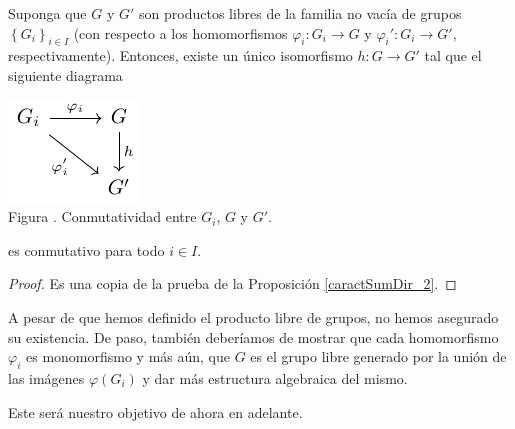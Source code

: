 \documentclass[12pt]{report}
\theoremstyle{largebreak}
\newcommand\cf[3]{\ensuremath{#1:#2\rightarrow#3}}
\newcounter{figcount}
\begin{document}
    \begin{propo}
        Suponga que $G$ y $G'$ son productos libres de la familia no vacía de grupos $\left\{G_i \right\}_{ i\in I}$ (con respecto a los homomorfismos $\cf{\varphi_i}{G_i}{G}$ y $\cf{\varphi_i'}{G_i}{G'}$, respectivamente). Entonces, existe un único isomorfismo $\cf{h}{G}{G'}$ tal que el siguiente diagrama

        \begin{minipage}{\textwidth}
            \begin{center}
                \includegraphics[scale=1.5]{images/fig_11.pdf}\\
                Figura \thefigcount. Conmutatividad entre $G_i$, $G$ y $G'$.
            \end{center}
        \end{minipage}

        es conmutativo para todo $i\in I$.
    \end{propo}

    \begin{proof}
        Es una copia de la prueba de la Proposición \ref{caractSumDir_2}. 
    \end{proof}

    A pesar de que hemos definido el producto libre de grupos, no hemos asegurado su existencia. De paso, también deberíamos de mostrar que cada homomorfismo $\varphi_i$ es monomorfismo y más aún, que $G$ es el grupo libre generado por la unión de las imágenes $\varphi(G_i)$ y dar más estructura algebraica del mismo.

    Este será nuestro objetivo de ahora en adelante.
\end{document}
